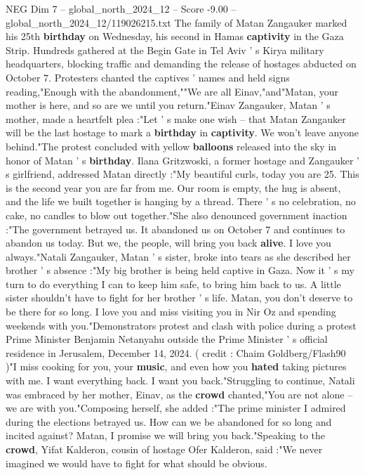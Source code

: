 \begin{textsample}{NEG Dim 7 – global\_north\_2024\_12 – Score -9.00 – global\_north\_2024\_12/119026215.txt}  \label{ex:f7_neg_159}
The family of Matan Zangauker marked his 25th \textbf{birthday} on Wednesday, his second in Hamas \textbf{captivity} in the Gaza Strip.
Hundreds gathered at the Begin Gate in Tel Aviv ' s Kirya military headquarters, blocking traffic and demanding the release of hostages abducted on October 7.
Protesters chanted the captives ' names and held signs reading,"Enough with the abandonment,""We are all Einav,"and"Matan, your mother is here, and so are we until you return."Einav Zangauker, Matan ' s mother, made a heartfelt plea :"Let ' s make one wish -- that Matan Zangauker will be the last hostage to mark a \textbf{birthday} in \textbf{captivity}.
We won't leave anyone behind."The protest concluded with yellow \textbf{balloons} released into the sky in honor of Matan ' s \textbf{birthday}.
Ilana Gritzwoski, a former hostage and Zangauker ' s girlfriend, addressed Matan directly :"My beautiful curls, today you are 25.
This is the second year you are far from me.
Our room is empty, the hug is absent, and the life we built together is hanging by a thread.
There ' s no celebration, no cake, no candles to blow out together."She also denounced government inaction :"The government betrayed us.
It abandoned us on October 7 and continues to abandon us today.
But we, the people, will bring you back \textbf{alive}.
I love you always."Natali Zangauker, Matan ' s sister, broke into tears as she described her brother ' s absence :"My big brother is being held captive in Gaza.
Now it ' s my turn to do everything I can to keep him safe, to bring him back to us.
A little sister shouldn't have to fight for her brother ' s life.
Matan, you don't deserve to be there for so long.
I love you and miss visiting you in Nir Oz and spending weekends with you."Demonstrators protest and clash with police during a protest Prime Minister Benjamin Netanyahu outside the Prime Minister ' s official residence in Jerusalem, December 14, 2024. ( credit : Chaim Goldberg/Flash90 )"I miss cooking for you, your \textbf{music}, and even how you \textbf{hated} taking pictures with me.
I want everything back.
I want you back."Struggling to continue, Natali was embraced by her mother, Einav, as the \textbf{crowd} chanted,"You are not alone -- we are with you."Composing herself, she added :"The prime minister I admired during the elections betrayed us.
How can we be abandoned for so long and incited against?
Matan, I promise we will bring you back."Speaking to the \textbf{crowd}, Yifat Kalderon, cousin of hostage Ofer Kalderon, said :"We never imagined we would have to fight for what should be obvious.

\end{textsample}
